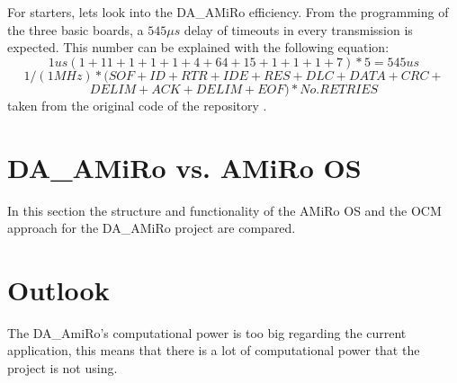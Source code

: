 \documentclass[12pt]{report}%
\begin{document}
For starters, lets look into the DA\_AMiRo efficiency. From the programming of the three basic boards, a $545\mu s$ delay of timeouts in every transmission is expected. This number can be explained with the following equation: $$1 us   (1+11+1+1+1+4+64+15+1+1+1+7)*5= 545 us$$ $$1/(1MHz)*(SOF+ID+RTR+IDE+RES+DLC+DATA+CRC+$$ $$DELIM+ACK+DELIM+EOF)*No. RETRIES$$
taken from the original code of the repository \cite{AMiRo_Wiki}.

\section{DA\_AMiRo vs. AMiRo OS}
In this section the structure and functionality of the AMiRo OS and the OCM approach for the DA\_AMiRo project are compared.



\section{Outlook}
The DA\_AmiRo's computational power is too big regarding the current application, this means that there is a lot of computational power that the project is not using.


\printbibliography
\nocite{*}
\end{document}
